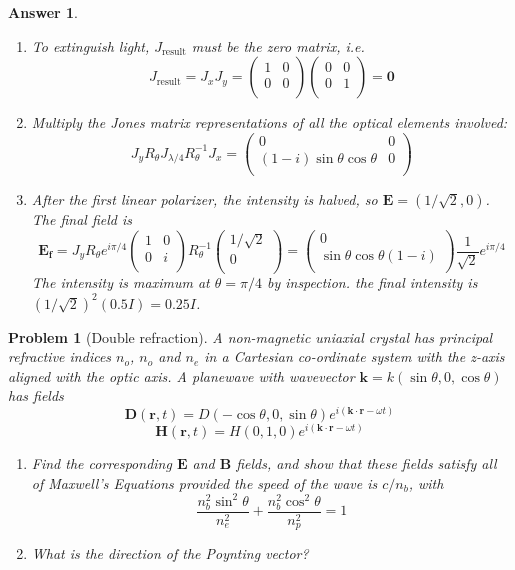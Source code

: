 \documentclass[a4paper]{article}
\newtheorem{ans}{Answer}[section]
\theoremstyle{new}
\newtheorem{qns}{Problem}[section]
\begin{document}
\begin{ans}\leavevmode
\begin{enumerate}[label=(\alph*)]
\item To extinguish light, $J_{\text{result}}$ must be the zero matrix, i.e.
$$J_{\text{result}}=J_xJ_y=\begin{pmatrix}1&0\\0&0\\\end{pmatrix}\begin{pmatrix}0&0\\0&1\\\end{pmatrix}=\boldsymbol{0}$$
\item Multiply the Jones matrix representations of all the optical elements involved:
$$J_yR_\theta J_{\lambda/4}R_\theta^{-1}J_x=\begin{pmatrix}0&0\\(1-i)\sin\theta\cos\theta&0\\\end{pmatrix}$$
\item After the first linear polarizer, the intensity is halved, so $\mathbf{E}=(1/\sqrt{2},0)$. The final field is
$$\mathbf{E_f}=J_yR_\theta e^{i\pi/4}\begin{pmatrix}1&0\\0&i\\\end{pmatrix}R_\theta^{-1}\begin{pmatrix}1/\sqrt{2}\\0\\\end{pmatrix}=\begin{pmatrix}0\\\sin\theta\cos\theta(1-i)\\\end{pmatrix}\frac{1}{\sqrt{2}}e^{i\pi/4}$$
The intensity is maximum at $\theta=\pi/4$ by inspection. the final intensity is $(1/\sqrt{2})^2(0.5I)=0.25 I$.
\end{enumerate}
\end{ans}
\begin{qns}[Double refraction]
A non-magnetic uniaxial crystal has principal refractive indices $n_o$, $n_o$ and $n_e$ in a Cartesian co-ordinate system with the z-axis aligned with the optic axis. A planewave with wavevector $\mathbf{k} = k(\sin\theta, 0, \cos \theta)$ has fields
$$\mathbf{D}(\mathbf{r},t)=D(-\cos\theta,0,\sin\theta)e^{i(\mathbf{k}\cdot\mathbf{r}-\omega t)}$$
$$\mathbf{H}(\mathbf{r},t)=H(0,1,0)e^{i(\mathbf{k}\cdot\mathbf{r}-\omega t)}$$
\begin{enumerate}[label=(\alph*)]
\item Find the corresponding $\mathbf{E}$ and $\mathbf{B}$ fields, and show that these fields satisfy all of Maxwell’s Equations provided the speed of the wave is $c/n_b$, with
$$\frac{n_b^2\sin^2\theta}{n_e^2}+\frac{n_b^2\cos^2\theta}{n_p^2}=1$$
\item What is the direction of the Poynting vector?
\end{enumerate}
\end{qns}
\end{document}
